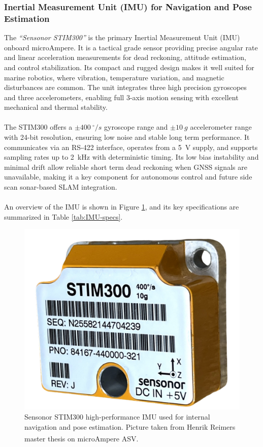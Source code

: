 \subsubsection{Inertial Measurement Unit (IMU) for Navigation and Pose Estimation}
\noindent
The \textit{``Sensonor STIM300''} is the primary Inertial Measurement Unit (IMU) onboard microAmpere. It is a tactical grade sensor providing precise angular rate and linear acceleration measurements for dead reckoning, attitude estimation, and control stabilization. Its compact and rugged design makes it well suited for marine robotics, where vibration, temperature variation, and magnetic disturbances are common. The unit integrates three high precision gyroscopes and three accelerometers, enabling full 3-axis motion sensing with excellent mechanical and thermal stability.
\\ \\
The STIM300 offers a $\pm400~^{\circ}/s$ gyroscope range and $\pm10~g$ accelerometer range with 24-bit resolution, ensuring low noise and stable long term performance. It communicates via an RS-422 interface, operates from a 5~V supply, and supports sampling rates up to 2~kHz with deterministic timing. Its low bias instability and minimal drift allow reliable short term dead reckoning when GNSS signals are unavailable, making it a key component for autonomous control and future side scan sonar-based SLAM integration.
\\ \\
An overview of the IMU is shown in Figure \ref{fig:microAmpere-imu}, and its key specifications are summarized in Table \ref{tab:IMU-specs}.
\begin{figure}[H]
    \centering
    \includegraphics[width=0.45\linewidth]{Pictures/Hardware/Sensors/IMU.png}
    \caption{Sensonor STIM300 high-performance IMU used for internal navigation and pose estimation. Picture taken from Henrik Reimers master thesis on microAmpere ASV.\textsuperscript{\cite{microAmpere_hardware_master_thesis1}}}
    \label{fig:microAmpere-imu}
\end{figure}

